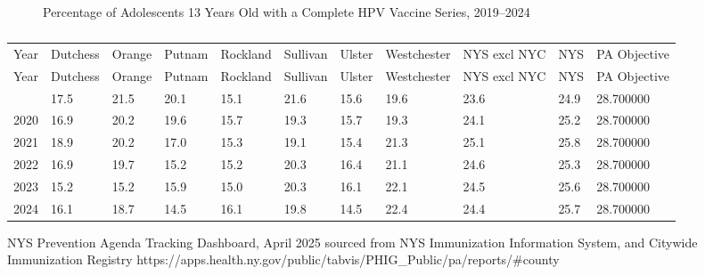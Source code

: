 \documentclass[
  english,
  letterpaper,
]{report}
\begin{document}
\begin{figure}


\caption{\label{fig-13yo-hpv-vaccine-complete-percent}Percentage of
Adolescents 13 Years Old with a Complete HPV Vaccine Series, 2019--2024}

\end{figure}%

\begin{longtable}[]{@{}lllllllllll@{}}

\caption{\label{tbl-13yo-hpv-vaccine-complete-percent}Percentage of
Adolescents 13 Years Old with a Complete HPV Vaccine Series, 2019--2024}

\tabularnewline

\caption{}\label{T_fe9e4}\tabularnewline
\toprule\noalign{}
Year & Dutchess & Orange & Putnam & Rockland & Sullivan & Ulster &
Westchester & NYS excl NYC & NYS & PA Objective \\
\midrule\noalign{}
\endfirsthead
\toprule\noalign{}
Year & Dutchess & Orange & Putnam & Rockland & Sullivan & Ulster &
Westchester & NYS excl NYC & NYS & PA Objective \\
\midrule\noalign{}
\endhead
\bottomrule\noalign{}
\endlastfoot
2019 & 17.5 & 21.5 & 20.1 & 15.1 & 21.6 & 15.6 & 19.6 & 23.6 & 24.9 &
28.700000 \\
2020 & 16.9 & 20.2 & 19.6 & 15.7 & 19.3 & 15.7 & 19.3 & 24.1 & 25.2 &
28.700000 \\
2021 & 18.9 & 20.2 & 17.0 & 15.3 & 19.1 & 15.4 & 21.3 & 25.1 & 25.8 &
28.700000 \\
2022 & 16.9 & 19.7 & 15.2 & 15.2 & 20.3 & 16.4 & 21.1 & 24.6 & 25.3 &
28.700000 \\
2023 & 15.2 & 15.2 & 15.9 & 15.0 & 20.3 & 16.1 & 22.1 & 24.5 & 25.6 &
28.700000 \\
2024 & 16.1 & 18.7 & 14.5 & 16.1 & 19.8 & 14.5 & 22.4 & 24.4 & 25.7 &
28.700000 \\

\end{longtable}

\begin{tcolorbox}[enhanced jigsaw, breakable, leftrule=.75mm, title=\textcolor{quarto-callout-note-color}{\faInfo}\hspace{0.5em}{Source}, bottomrule=.15mm, opacityback=0, left=2mm, colback=white, bottomtitle=1mm, coltitle=black, colbacktitle=quarto-callout-note-color!10!white, colframe=quarto-callout-note-color-frame, opacitybacktitle=0.6, toptitle=1mm, titlerule=0mm, arc=.35mm, rightrule=.15mm, toprule=.15mm]

NYS Prevention Agenda Tracking Dashboard, April 2025 sourced from NYS
Immunization Information System, and Citywide Immunization Registry
https://apps.health.ny.gov/public/tabvis/PHIG\_Public/pa/reports/\#county

\end{tcolorbox}
\end{document}
